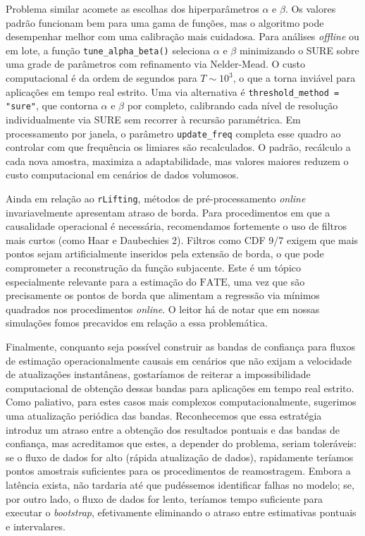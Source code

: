 Problema similar acomete as escolhas dos hiperparâmetros \(\alpha\) e \(\beta\). 
Os valores padrão funcionam bem para uma gama de funções, mas o algoritmo pode desempenhar melhor com uma calibração mais cuidadosa. 
Para análises \emph{offline} ou em lote, a função \texttt{tune\_alpha\_beta()} seleciona \(\alpha\) e \(\beta\) minimizando o SURE sobre uma grade de parâmetros com refinamento via Nelder-Mead. 
O custo computacional é da ordem de segundos para \(T \sim 10^3\), o que a torna inviável para aplicações em tempo real estrito. 
Uma via alternativa é \texttt{threshold\_method = "sure"}, que contorna \(\alpha\) e \(\beta\) por completo, calibrando cada nível de resolução individualmente via SURE sem recorrer à recursão paramétrica. 
Em processamento por janela, o parâmetro \texttt{update\_freq} completa esse quadro ao controlar com que frequência os limiares são recalculados. 
O padrão, recálculo a cada nova amostra, maximiza a adaptabilidade, mas valores maiores reduzem o custo computacional em cenários de dados volumosos.

Ainda em relação ao \texttt{rLifting}, métodos de pré-processamento \emph{online} invariavelmente apresentam atraso de borda. 
Para procedimentos em que a causalidade operacional é necessária, recomendamos fortemente o uso de filtros mais curtos (como Haar e Daubechies 2). 
Filtros como CDF 9/7 exigem que mais pontos sejam artificialmente inseridos pela extensão de borda, o que pode comprometer a reconstrução da função subjacente. 
Este é um tópico especialmente relevante para a estimação do \(\mathrm{FATE}\), uma vez que são precisamente os pontos de borda que alimentam a regressão via mínimos quadrados nos procedimentos \emph{online}. 
O leitor há de notar que em nossas simulações fomos precavidos em relação a essa problemática.

Finalmente, conquanto seja possível construir as bandas de confiança para fluxos de estimação operacionalmente causais em cenários que não exijam a velocidade de atualizações instantâneas, gostaríamos de reiterar a impossibilidade computacional de obtenção dessas bandas para aplicações em tempo real estrito. 
Como paliativo, para estes casos mais complexos computacionalmente, sugerimos uma atualização periódica das bandas. 
Reconhecemos que essa estratégia introduz um atraso entre a obtenção dos resultados pontuais e das bandas de confiança, mas acreditamos que estes, a depender do problema, seriam toleráveis: se o fluxo de dados for alto (rápida atualização de dados), rapidamente teríamos pontos amostrais suficientes para os procedimentos de reamostragem. 
Embora a latência exista, não tardaria até que pudéssemos identificar falhas no modelo; se, por outro lado, o fluxo de dados for lento, teríamos tempo suficiente para executar o \emph{bootstrap}, efetivamente eliminando o atraso entre estimativas pontuais e intervalares.